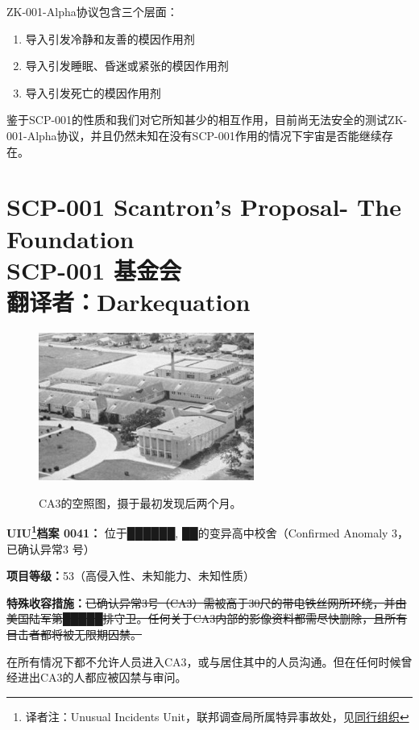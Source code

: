 \documentclass[openany,a4paper]{book} %
\newcounter{mychapter} %
\begin{document}
ZK-001-Alpha协议包含三个层面：

\begin{enumerate}
  \item 导入引发冷静和友善的模因作用剂
  \item 导入引发睡眠、昏迷或紧张的模因作用剂
  \item 导入引发死亡的模因作用剂
\end{enumerate}

鉴于SCP-001的性质和我们对它所知甚少的相互作用，目前尚无法安全的测试ZK-001-Alpha协议，并且仍然未知在没有SCP-001作用的情况下宇宙是否能继续存在。

\addtocounter{mychapter}{1}
\chapter[SCP-001 基金会]{SCP-001 Scantron's Proposal- The Foundation \\ SCP-001 基金会 \\ 翻译者：Darkequation}\label{chap:SCP-001-9}
\begin{figure}[H]
  \centering
  \includegraphics[width = 200pt]{Pic/SCP-001-9.jpg}\\
  \caption{CA3的空照图，摄于最初发现后两个月。}\label{fig:SCP-001-9}
\end{figure}

\textbf{UIU\footnote{译者注：Unusual Incidents Unit，联邦调查局所属特异事故处，见\hyperref[chap:同行组织]{同行组织}}档案 0041：} 位于██████, ██的变异高中校舍（Confirmed Anomaly 3，已确认异常3 号）\vspace{12pt}

\textbf{项目等级：}53（高侵入性、未知能力、未知性质）\vspace{12pt}

\textbf{特殊收容措施：}\sout{已确认异常3号（CA3）需被高于30尺的带电铁丝网所环绕，并由美国陆军第█████排守卫。任何关于CA3内部的影像资料都需尽快删除，且所有目击者都将被无限期囚禁。}\vspace{12pt}

在所有情况下都不允许人员进入CA3，或与居住其中的人员沟通。但在任何时候曾经进出CA3的人都应被囚禁与审问。\vspace{12pt}
\end{document}
